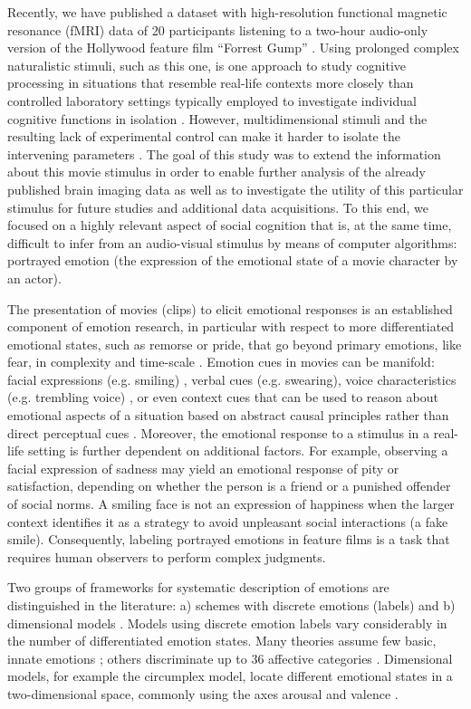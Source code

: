 \documentclass[10pt,a4paper,twocolumn]{article}
\begin{document}
Recently, we have published a dataset with high-resolution functional magnetic
resonance (fMRI) data of 20 participants listening to a two-hour audio-only
version of the Hollywood feature film ``Forrest Gump'' \cite{HBI+14}. Using
prolonged complex naturalistic stimuli, such as this one, is one approach to
study cognitive processing in situations that resemble real-life contexts more
closely than controlled laboratory settings typically employed to investigate
individual cognitive functions in isolation \cite{HH2012}. However,
multidimensional stimuli and the resulting lack of experimental control can
make it harder to isolate the intervening parameters \cite{HH2012}. The goal
of this study was to extend the information about this movie stimulus in order
to enable further analysis of the already published brain imaging data as well
as to investigate the utility of this particular stimulus for future studies and
additional data acquisitions. To this end, we focused on a highly relevant
aspect of social cognition that is, at the same time, difficult to infer from
an audio-visual stimulus by means of computer algorithms: portrayed emotion
(the expression of the emotional state of a movie character by an actor).

The presentation of movies (clips) to elicit emotional responses is an
established component of emotion research, in particular with respect to more
differentiated emotional states, such as remorse or pride, that go beyond
primary emotions, like fear, in complexity and time-scale \cite{GL1995}.
Emotion cues in movies can be manifold: facial expressions (e.g. smiling)
\cite{Ekm1992b}, verbal cues (e.g. swearing), voice characteristics (e.g.
trembling voice) \cite{EVS+2009}, or even context cues that can be used to
reason about emotional aspects of a situation based on abstract causal
principles rather than direct perceptual cues \cite{SS2014}. Moreover, the
emotional response to a stimulus in a real-life setting is further dependent on
additional factors. For example, observing a facial expression of sadness may
yield an emotional response of pity or satisfaction, depending on whether the
person is a friend or a punished offender of social norms. A smiling face is
not an expression of happiness when the larger context identifies it as a
strategy to avoid unpleasant social interactions (a fake smile). Consequently,
labeling portrayed emotions in feature films is a task that requires human
observers to perform complex judgments.

Two groups of frameworks for systematic description of emotions are
distinguished in the literature: a) schemes with discrete emotions (labels) and
b) dimensional models \cite{GW2007}. Models using discrete emotion labels vary
considerably in the number of differentiated emotion states. Many theories
assume few basic, innate emotions \cite{Ekm1992a}; others discriminate up to 36
affective categories \cite{Sch2005}. Dimensional models, for example the
circumplex model, locate different emotional states in a two-dimensional space,
commonly using the axes arousal and valence \cite{Rus1980}.
\end{document}
